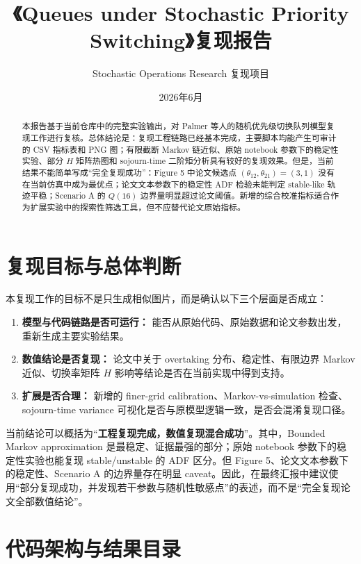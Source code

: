\documentclass[UTF8,a4paper,11pt]{ctexart}
\title{《Queues under Stochastic Priority Switching》复现报告}
\author{Stochastic Operations Research 复现项目}
\date{2026年6月}
\begin{document}
\maketitle

\begin{abstract}
本报告基于当前仓库中的完整实验输出，对 Palmer 等人的随机优先级切换队列模型复现工作进行复核。总体结论是：复现工程链路已经基本完成，主要脚本均能产生可审计的 CSV 指标表和 PNG 图；有限截断 Markov 链近似、原始 notebook 参数下的稳定性实验、部分 $H$ 矩阵热图和 sojourn-time 二阶矩分析具有较好的复现效果。但是，当前结果不能简单写成“完全复现成功”：Figure 5 中论文候选点 $(\theta_{12},\theta_{21})=(3,1)$ 没有在当前仿真中成为最优点；论文文本参数下的稳定性 ADF 检验未能判定 stable-like 轨迹平稳；Scenario A 的 $Q(16)$ 边界量明显超过论文阈值。新增的综合校准指标适合作为扩展实验中的探索性筛选工具，但不应替代论文原始指标。
\end{abstract}

\tableofcontents
\newpage

\section{复现目标与总体判断}

本复现工作的目标不是只生成相似图片，而是确认以下三个层面是否成立：

\begin{enumerate}
  \item \textbf{模型与代码链路是否可运行：} 能否从原始代码、原始数据和论文参数出发，重新生成主要实验结果。
  \item \textbf{数值结论是否复现：} 论文中关于 overtaking 分布、稳定性、有限边界 Markov 近似、切换率矩阵 $H$ 影响等结论是否在当前实现中得到支持。
  \item \textbf{扩展是否合理：} 新增的 finer-grid calibration、Markov-vs-simulation 检查、sojourn-time variance 可视化是否与原模型逻辑一致，是否会混淆复现口径。
\end{enumerate}

当前结论可以概括为“\textbf{工程复现完成，数值复现混合成功}”。其中，Bounded Markov approximation 是最稳定、证据最强的部分；原始 notebook 参数下的稳定性实验也能复现 stable/unstable 的 ADF 区分。但 Figure 5、论文文本参数下的稳定性、Scenario A 的边界量存在明显 caveat。因此，在最终汇报中建议使用“部分复现成功，并发现若干参数与随机性敏感点”的表述，而不是“完全复现论文全部数值结论”。

\section{代码架构与结果目录}
\end{document}
